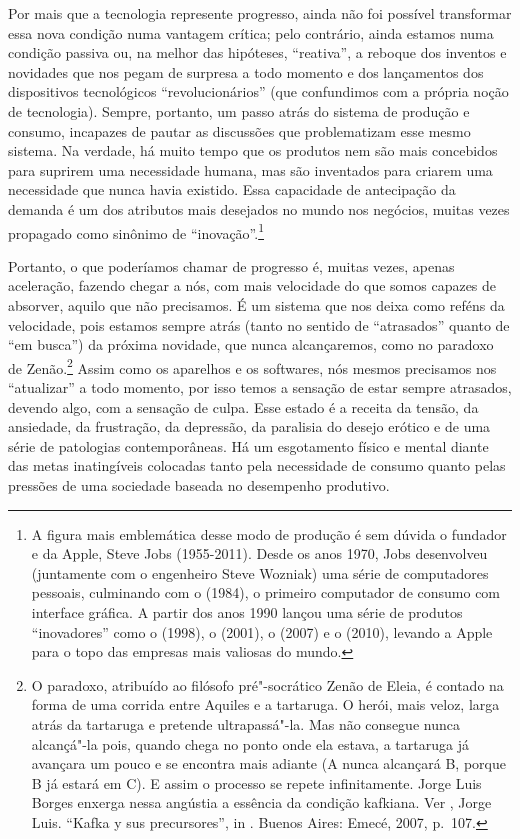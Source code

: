 Por mais que a tecnologia represente progresso, ainda não foi possível
transformar essa nova condição numa vantagem crítica; pelo contrário,
ainda estamos numa condição passiva ou, na melhor das hipóteses,
``reativa'', a reboque dos inventos e novidades que nos pegam de
surpresa a todo momento e dos lançamentos dos dispositivos tecnológicos
``revolucionários'' (que confundimos com a própria noção de tecnologia).
Sempre, portanto, um passo atrás do sistema de produção e consumo,
incapazes de pautar as discussões que problematizam esse mesmo sistema.
Na verdade, há muito tempo que os produtos nem são mais concebidos para
suprirem uma necessidade humana, mas são inventados para criarem uma
necessidade que nunca havia existido. Essa capacidade de antecipação da
demanda é um dos atributos mais desejados no mundo nos negócios, muitas
vezes propagado como sinônimo de ``inovação''.\footnote{A figura mais
  emblemática desse modo de produção é sem dúvida o fundador e  da
  Apple, Steve Jobs (1955-2011). Desde os anos 1970, Jobs desenvolveu
  (juntamente com o engenheiro Steve Wozniak) uma série de computadores
  pessoais, culminando com o {} (1984), o primeiro
  computador de consumo com interface gráfica. A partir dos anos 1990
  lançou uma série de produtos ``inovadores'' como o {} (1998),
  o {} (2001), o {} (2007) e o {} (2010),
  levando a Apple para o topo das empresas mais valiosas do mundo.}

Portanto, o que poderíamos chamar de progresso é, muitas vezes, apenas
aceleração, fazendo chegar a nós, com mais velocidade do que somos
capazes de absorver, aquilo que não precisamos. É um sistema que nos
deixa como reféns da velocidade, pois estamos sempre atrás (tanto no
sentido de ``atrasados'' quanto de ``em busca'') da próxima novidade,
que nunca alcançaremos, como no paradoxo de Zenão.\footnote{O paradoxo,
  atribuído ao filósofo pré"-socrático Zenão de Eleia, é contado na forma
  de uma corrida entre Aquiles e a tartaruga. O herói, mais veloz, larga
  atrás da tartaruga e pretende ultrapassá"-la. Mas não consegue nunca
  alcançá"-la pois, quando chega no ponto onde ela estava, a tartaruga já
  avançara um pouco e se encontra mais adiante (A nunca alcançará B,
  porque B já estará em C). E assim o processo se repete infinitamente.
  Jorge Luis Borges enxerga nessa angústia a essência da condição
  kafkiana. Ver , Jorge Luis. ``Kafka y sus precursores'', in
  {}. Buenos Aires: Emecé, 2007, p.~107.} Assim como os aparelhos e os softwares, nós mesmos precisamos
nos ``atualizar'' a todo momento, por isso temos a sensação de estar
sempre atrasados, devendo algo, com a sensação de culpa. Esse estado é a
receita da tensão, da ansiedade, da frustração, da depressão, da
paralisia do desejo erótico e de uma série de patologias contemporâneas.
Há um esgotamento físico e mental diante das metas inatingíveis
colocadas tanto pela necessidade de consumo quanto pelas pressões de uma
sociedade baseada no desempenho produtivo.

